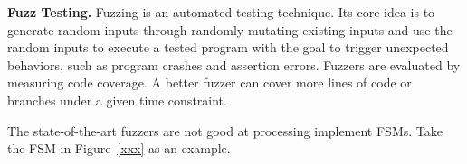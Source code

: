 \noindent\textbf{Fuzz Testing.}
Fuzzing is an automated testing technique. Its core idea is 
to generate random inputs through randomly mutating existing inputs and 
use the random inputs to execute 
a tested program with the goal to trigger unexpected behaviors,
such as program crashes and assertion errors.
Fuzzers are evaluated by measuring code coverage. 
A better fuzzer can cover more lines of code 
or branches under a given time constraint. 


The state-of-the-art fuzzers are not good at processing 
implement FSMs.
Take the FSM in Figure~\ref{xxx} as an example. 
